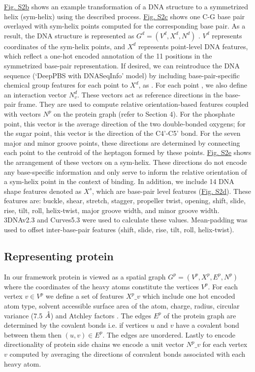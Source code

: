 \hyperref[fig:pdnaS2]{Fig. S2b} shows an example transformation of a DNA structure to a symmetrized helix (sym-helix) using the described process. \hyperref[fig:pdnaS2]{Fig. S2c} shows one C-G base pair overlayed with sym-helix points computed for the corresponding base pair. As a result, the DNA structure is represented as $G^d = (V^d, X^d, N^d)$ .  $V^d$ represents coordinates of the sym-helix points, and $X^d$ represents point-level DNA features, which reflect a one-hot encoded annotation of the 11 positions in the symmetrized base-pair representation. If desired, we can reintroduce the DNA sequence (`DeepPBS with DNASeqInfo' model) by including base-pair-specific chemical group features for each point to $X^d$, as \citep{Chiu2023}. For each point , we also define an interaction vector $N^d_v$. These vectors act as reference directions in the base-pair frame. They are used to compute relative orientation-based features coupled with vectors $N^p$ on the protein graph (refer to Section 4). For the phosphate point, this vector is the average direction of the two double-bonded oxygens; for the sugar point, this vector is the direction of the C4'-C5' bond. For the seven major and minor groove points, these directions are determined by connecting each point to the centroid of the heptagon formed by these points. \hyperref[fig:pdnaS2]{Fig. S2e} shows the arrangement of these vectors on a sym-helix. These directions do not encode any base-specific information and only serve to inform the relative orientation of a sym-helix point in the context of binding. In addition, we include 14 DNA shape features \citep{Lavery2009, Lu2008, lavery1989defining} denoted as $X^s$, which are base-pair level features (\hyperref[fig:pdnaS2]{Fig. S2d}). These features are: buckle, shear, stretch, stagger, propeller twist, opening, shift, slide, rise, tilt, roll, helix-twist, major groove width, and minor groove width. 3DNAv2.3 \citep{Lu2008} and Curves5.3 \citep{Lavery2009, lavery1989defining} were used to calculate these values. Mean-padding was used to offset inter-base-pair features (shift, slide, rise, tilt, roll, helix-twist).

\subsection{Representing protein}

In our framework protein is viewed as a spatial graph $G^p = (V^p, X^p, E^p, N^p)$  where the
coordinates of the heavy atoms constitute the vertices $V^p$. For each vertex $v \in V^p$  we define
a set of features $X^p\_v$ which include one hot encoded atom type, solvent accessible surface area
of the atom, charge, radius, circular variance (7.5 $\AA$) and Atchley factors \citep{Atchley2005}. The edges $E^p$ of the protein
graph  are determined by the covalent bonds i.e. if  vertices $u$ and $v$ have
a covalent bond between them then $(u,v) \in E^p$. The edges are unordered. Lastly to encode
directionality of protein side chains we encode a unit vector $N^p\_v$ for each vertex $v$ computed by
averaging the directions of convalent bonds associated with each heavy atom. 

